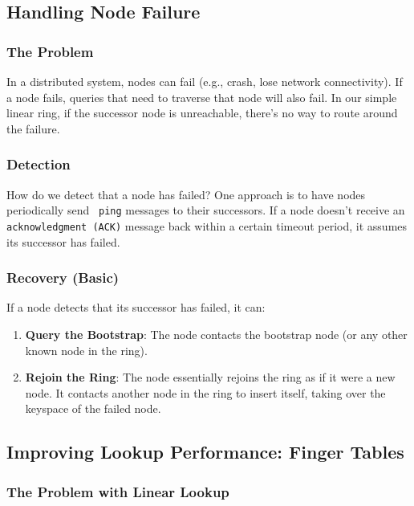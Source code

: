 \subsection{Handling Node Failure}

\subsubsection{The Problem}

In a distributed system, nodes can fail (e.g., crash, lose network connectivity). If a node fails, queries that need to traverse that node will also fail.  In our simple linear ring, if the successor node is unreachable, there's no way to route around the failure.

\subsubsection{Detection}

How do we detect that a node has failed?  One approach is to have nodes periodically send \texttt{ ping} messages to their successors.  If a node doesn't receive an \texttt{acknowledgment (ACK)} message back within a certain timeout period, it assumes its successor has failed.

\subsubsection{Recovery (Basic)}

If a node detects that its successor has failed, it can:

\begin{enumerate}[itemsep=1pt, topsep=1pt]
    \item \textbf{Query the Bootstrap}:  The node contacts the bootstrap node (or any other known node in the ring).
    \item \textbf{Rejoin the Ring}:  The node essentially rejoins the ring as if it were a new node. It contacts another node in the ring to insert itself, taking over the keyspace of the failed node.
\end{enumerate}

\subsection{Improving Lookup Performance: Finger Tables}

\subsubsection{The Problem with Linear Lookup}

